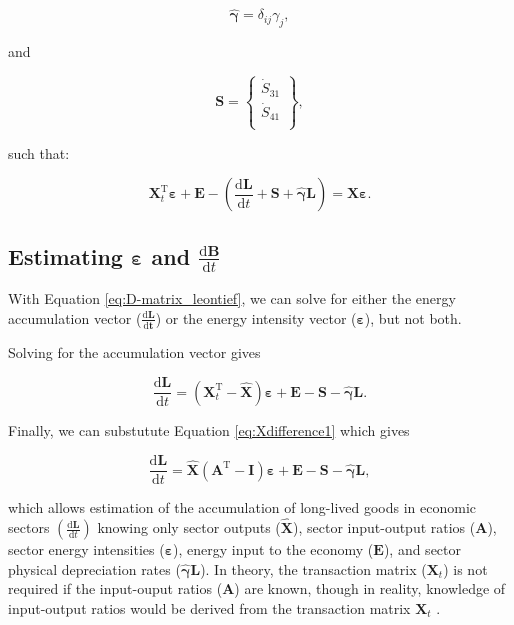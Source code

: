 \documentclass[authoryear,preprint,review,12pt]{elsarticle}
\let\oldhat\hat
\renewcommand{\vec}[1]{\mathbf{#1}}
\renewcommand{\hat}[1]{\oldhat{\mathbf{#1}}}
\begin{document}
\begin{equation} \label{eq:D-B_hat_matrix_def}
	\hat{\vec{\gamma}} = \delta_{ij}\gamma_{j},
\end{equation}

\noindent and

\begin{equation} \label{eq:D-S_vec_def}
	\vec{S} =		\begin{Bmatrix} 	\dot{S}_{31}	\\
													\dot{S}_{41}\\
						\end{Bmatrix},
\end{equation}

\noindent such that:

\begin{equation} \label{D-eq:matrix_leontief}
	\vec{X}_{t}^{\mathrm{T}}\vec{\varepsilon} + \vec{E} - \left(\frac{\mathrm{d}\vec{L}}{\mathrm{d}t} +\vec{S} + \hat{\vec{\gamma}}\vec{L}\right) = \hat{\vec{X}}\vec{\varepsilon}.
\end{equation}

\subsection{Estimating $\vec{\varepsilon}$ and $\frac{\mathrm{d}\vec{B}}{\mathrm{d}t}$}

With Equation \ref{eq:D-matrix_leontief}, we can solve for either the energy accumulation vector ($\vec{\frac{\mathrm{d}L}{\mathrm{d}t}}$) or the energy intensity vector ($\vec{\varepsilon}$), but not both. 

Solving for the accumulation vector gives

\begin{equation} \label{eq:D-dL_dt_leontief}
	\frac{\mathrm{d}\vec{L}}{\mathrm{d}t} = (\vec{X}_{t}^{\mathrm{T}} - \hat{\vec{X}})\vec{\varepsilon} + \vec{E} - \vec{S} - \hat{\vec{\gamma}}\vec{L}.
\end{equation}

\noindent Finally, we can substutute Equation \ref{eq:Xdifference1} which gives

\begin{equation} \label{eq:D-dB_dt_leontief_with_A}
	\frac{\mathrm{d}\vec{L}}{\mathrm{d}t} = \hat{\vec{X}} (\vec{A}^{\mathrm{T}} - \vec{I}) \vec{\varepsilon} + \vec{E} - \vec{S} - \hat{\vec{\gamma}}\vec{L},
\end{equation}

\noindent which allows estimation of the accumulation of long-lived goods in economic sectors $\left(\frac{\mathrm{d}\vec{L}}{\mathrm{d}t}\right)$ knowing only sector outputs ($\hat{\vec{X}}$), sector input-output ratios ($\vec{A}$), sector energy intensities ($\vec{\varepsilon}$), energy input to the economy ($\vec{E}$), and sector physical depreciation rates ($\hat{\vec{\gamma}}\vec{L}$). In theory, the transaction matrix ($\vec{X}_{t}$) is not required if the input-ouput ratios ($\vec{A}$) are known, though in reality, knowledge of input-output ratios would be derived from the transaction matrix $\vec{X}_{t}$ .
\end{document}
